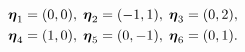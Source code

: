 \begin{align}\label{eq: phase-sol}
\boldsymbol{\eta}_1 = (0,0),\; \boldsymbol{\eta}_2 = (-1,1),\; \boldsymbol{\eta}_3 = (0,2),\notag\\
\boldsymbol{\eta}_4 = (1,0),\; \boldsymbol{\eta}_5 = (0,-1),\; \boldsymbol{\eta}_6 = (0,1).
\end{align}
\begin{comment}
where
\begin{align*}
(\V{\eta}_3-\V{\eta}_4)^\top(-\pi/2, \pi/2) &=-\pi/2\,(\text{mod}\,2\pi)\notag\\
 (\V{\eta}_6 - \V{\eta}_1)^\top(\pi/2,\pi/2) &= \pi/2\, (\text{mod}\,2\pi)\notag
\end{align*}
\end{comment}

